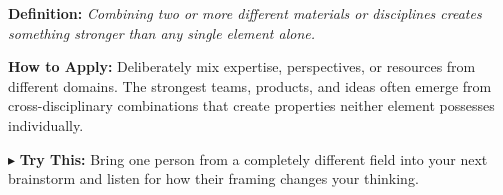 \begin{tcolorbox}[title={\small \textbf{34 | Alloying}},
  colback=blue!5!white, colframe=blue!40!black,
  fonttitle=\bfseries\small, boxrule=0.5pt]
\textbf{Definition:} \textit{Combining two or more different materials or disciplines creates something stronger than any single element alone.}

\medskip
\textbf{How to Apply:} Deliberately mix expertise, perspectives, or resources from different domains. The strongest teams, products, and ideas often emerge from cross-disciplinary combinations that create properties neither element possesses individually.

\medskip
$\blacktriangleright$ \textbf{Try This:} Bring one person from a completely different field into your next brainstorm and listen for how their framing changes your thinking.
\end{tcolorbox}

